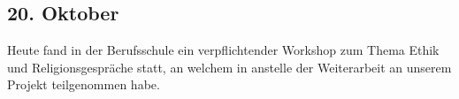 \subsection{20. Oktober}
Heute fand in der Berufsschule ein verpflichtender Workshop zum Thema Ethik und Religionsgespräche statt, an welchem in anstelle der Weiterarbeit an unserem Projekt teilgenommen habe.